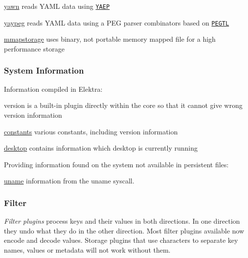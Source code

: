 \begin{DoxyItemize}
\item \hyperlink{md_src_plugins_yawn_README_src_plugins_yawn_README_md}{yawn} reads Y\+A\+ML data using \href{https://github.com/vnmakarov/yaep}{\tt Y\+A\+EP}
\item \hyperlink{md_src_plugins_yaypeg_README_src_plugins_yaypeg_README_md}{yaypeg} reads Y\+A\+ML data using a P\+EG parser combinators based on \href{https://github.com/taocpp/PEGTL}{\tt P\+E\+G\+TL}
\item \hyperlink{md_src_plugins_mmapstorage_README_src_plugins_mmapstorage_README_md}{mmapstorage} uses binary, not portable memory mapped file for a high performance storage
\end{DoxyItemize}

\subsubsection*{System Information}

Information compiled in Elektra\+:


\begin{DoxyItemize}
\item version is a built-\/in plugin directly within the core so that it cannot give wrong version information
\item \hyperlink{md_src_plugins_constants_README_src_plugins_constants_README_md}{constants} various constants, including version information
\item \hyperlink{md_src_plugins_desktop_README_src_plugins_desktop_README_md}{desktop} contains information which desktop is currently running
\end{DoxyItemize}

Providing information found on the system not available in persistent files\+:


\begin{DoxyItemize}
\item \hyperlink{md_src_plugins_uname_README_src_plugins_uname_README_md}{uname} information from the uname syscall.
\end{DoxyItemize}

\subsubsection*{Filter}

{\itshape Filter plugins} process keys and their values in both directions. In one direction they undo what they do in the other direction. Most filter plugins available now encode and decode values. Storage plugins that use characters to separate key names, values or metadata will not work without them.


